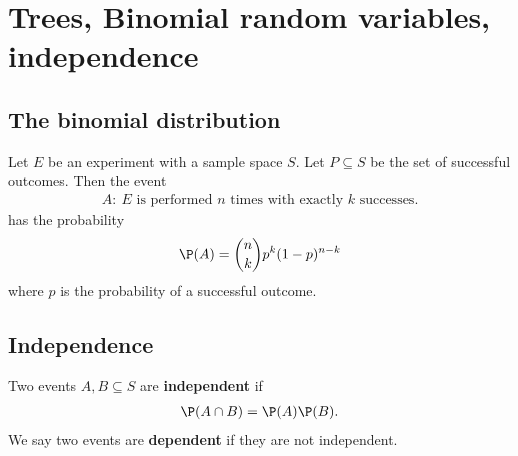 \documentclass{article}
\begin{document}
\section{Trees, Binomial random variables, independence}
\subsection{The binomial distribution}
\begin{definition}
    Let $E$ be an experiment with a sample space $S$.
    Let $P\subseteq S$ be the set of successful outcomes.
    Then the event
    \begin{align*}
        A:\:\text{$E$ is performed $n$ times with exactly $k$ successes.}
    \end{align*}
    has the probability
    \begin{align*}
        \P(A) = \binom{n}{k}p^k (1-p)^{n-k}
    \end{align*}
    where $p$ is the probability of a successful outcome.
\end{definition}
\subsection{Independence}
\begin{definition}
    Two events $A,B\subseteq S$ are \textbf{independent} if
    \begin{align*}
        \P(A\cap B) = \P(A)\P(B).
    \end{align*}
    We say two events are \textbf{dependent} if they are not independent.
\end{definition}
\end{document}
